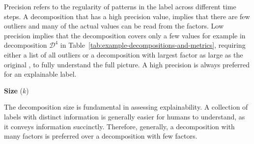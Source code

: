 Precision refers to the regularity of patterns in the label across different time steps.
A decomposition that has a high precision value, implies that there are few outliers and many of the actual values can be read from the factors.
Low precision implies that the decomposition covers only a few values for example in decomposition $\mathcal{D}^4$ in Table~\ref{tab:example-decompositions-and-metrics}, requiring either a list of all outliers or a decomposition with largest factor as large as the original \DFA, to fully understand the full picture.
A high precision is always preferred for an explainable label. 

\textbf{Size} ($k$)

The decomposition size is fundamental in assessing explainability.
A collection of labels with distinct information is generally easier for humans to understand, as it conveys information succinctly.
Therefore, generally, a decomposition with many factors is preferred over a decomposition with few factors.

